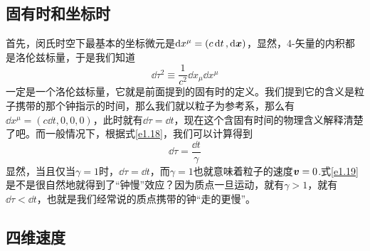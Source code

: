 \documentclass[12pt, a4paper, oneside]{ctexbook}
\begin{document}
\subsection{固有时和坐标时}

首先，闵氏时空下最基本的坐标微元是$\dd{x^{\mu}}=(c\dd{t},\dd{\vb*{x}})$，显然，4-矢量的内积都是洛伦兹标量，于是我们知道
\begin{equation}\label{e1.18}
	\dd{\tau^{2}}\equiv\dfrac{1}{c^{2}}\dd{x_{\mu}}\dd{x^{\mu}}
\end{equation}
一定是一个洛伦兹标量，它就是前面提到的固有时的定义。我们提到它的含义是粒子携带的那个钟指示的时间，那么我们就以粒子为参考系，那么有$\dd{x^{\mu}}=(c\dd{t},0,0,0)$，此时就有$\dd{\tau}=\dd{t}$，现在这个含固有时间的物理含义解释清楚了吧。而一般情况下，根据式\eqref{e1.18}，我们可以计算得到
\begin{equation}\label{e1.19}
	\dd{\tau}=\dfrac{\dd{t}}{\gamma}
\end{equation}
显然，当且仅当$\gamma=1$时，$\dd{\tau}=\dd{t}$，而$\gamma=1$也就意味着粒子的速度$\vb*{v}=0$.式\eqref{e1.19}是不是很自然地就得到了“钟慢”效应？因为质点一旦运动，就有$\gamma>1$，就有$\dd{\tau}<\dd{t}$，也就是我们经常说的质点携带的钟“走的更慢”。\par 

\subsection{四维速度}
\end{document}
